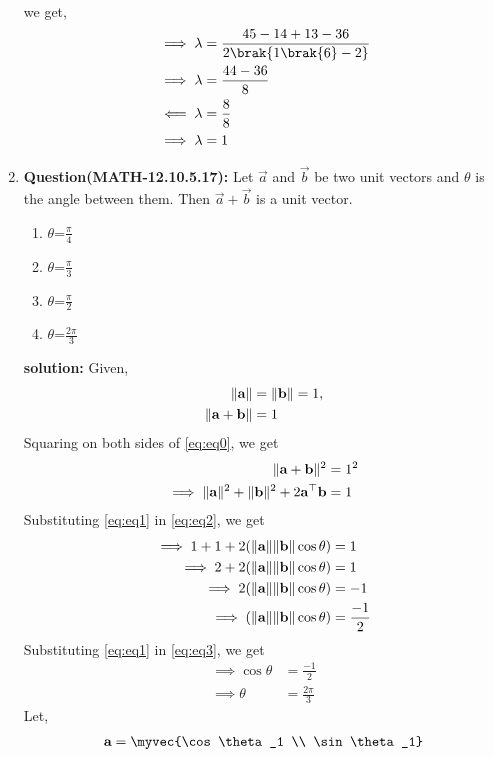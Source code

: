 \begin{enumerate}[label=\thesection.\arabic*,ref=\thesection.\theenumi]
\begin{align*}
\end{align*}
we get,
\begin{align}   
&\implies\lambda=\frac{45-14+13-36}{2\brak{1\brak{6}-2}}\\
&\implies\lambda=\frac{44-36}{8}\\
&\impliedby\lambda=\frac{8}{8}\\
 &\implies \lambda = 1
\end{align}
\item \textbf{Question(MATH-12.10.5.17):}
       Let $\vec{a}$ and $\vec{b}$ be two unit vectors and $\theta$ is the angle between them. Then $\vec{a}+\vec{b}$ is a unit vector.
 \begin{enumerate}[label=(\Alph*)]                     
 \item $\theta$=$\frac{\pi}{4}$
 \item $\theta$=$\frac{\pi}{3}$
  \item $\theta$=$\frac{\pi}{2}$
   \item $\theta$=$\frac{2\pi}{3}$
   \end{enumerate}
   \textbf{solution:}
Given,
\begin{align}
 \lVert\textbf{a}\rVert &= \lVert\textbf{b}\rVert=1 
 \label{eq:eq1},\\
 \lVert\textbf{a}+\textbf{b}\rVert&=1
 \label{eq:eq0}
 \end{align}
Squaring on both sides of \eqref{eq:eq0}, we get
\begin{align}
 \lVert\textbf{a}+\textbf{b}\rVert^2 &=1^2
\\
 \implies \lVert\textbf{a}\rVert^2 + \lVert\textbf{b}\rVert^2 + 2\textbf{a}^{\top}\textbf{b} &= 1
 \label{eq:eq2}
\end{align}
Substituting \eqref{eq:eq1} in \eqref{eq:eq2}, we get
\begin{align}
 \implies 1+1+2(\lVert\textbf{a}\rVert\lVert\textbf{b}\rVert\cos{\theta}) &=1\\
 \implies 2+2(\lVert\textbf{a}\rVert\lVert\textbf{b}\rVert\cos{\theta}) &=1\\
 \implies 2(\lVert\textbf{a}\rVert\lVert\textbf{b}\rVert\cos{\theta}) &=-1\\
 \implies (\lVert\textbf{a}\rVert\lVert\textbf{b}\rVert\cos{\theta}) &=\frac{-1}{2}
 \label{eq:eq3}
\end{align}
Substituting \eqref{eq:eq1} in \eqref{eq:eq3}, we get
\begin{align}
 \implies \cos{\theta} &=\frac{-1}{2}
 \\
 \implies \theta &=\frac{2\pi}{3}
\end{align}
Let, \begin{align}
 \vec{a} &= \myvec{\cos \theta_1 \\ \sin \theta_1}\\

\end{align}
\end{enumerate}
